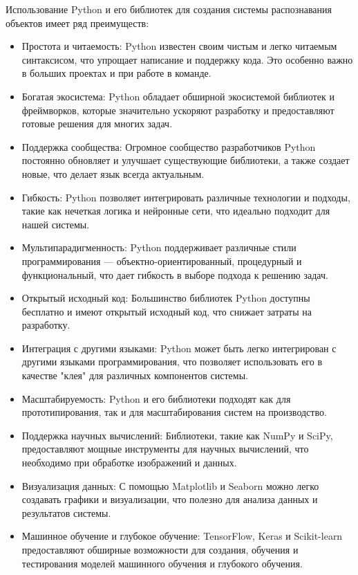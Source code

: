 Использование Python и его библиотек для создания системы распознавания объектов имеет ряд преимуществ:

\begin{itemize}
\item Простота и читаемость: Python известен своим чистым и легко читаемым синтаксисом, что упрощает написание и поддержку кода. Это особенно важно в больших проектах и при работе в команде.
\item Богатая экосистема: Python обладает обширной экосистемой библиотек и фреймворков, которые значительно ускоряют разработку и предоставляют готовые решения для многих задач.
\item Поддержка сообщества: Огромное сообщество разработчиков Python постоянно обновляет и улучшает существующие библиотеки, а также создает новые, что делает язык всегда актуальным.
\item Гибкость: Python позволяет интегрировать различные технологии и подходы, такие как нечеткая логика и нейронные сети, что идеально подходит для нашей системы.
\item Мультипарадигменность: Python поддерживает различные стили программирования — объектно-ориентированный, процедурный и функциональный, что дает гибкость в выборе подхода к решению задач.
\item Открытый исходный код: Большинство библиотек Python доступны бесплатно и имеют открытый исходный код, что снижает затраты на разработку.
\item Интеграция с другими языками: Python может быть легко интегрирован с другими языками программирования, что позволяет использовать его в качестве "клея" для различных компонентов системы.
\item Масштабируемость: Python и его библиотеки подходят как для прототипирования, так и для масштабирования систем на производство.
\item Поддержка научных вычислений: Библиотеки, такие как NumPy и SciPy, предоставляют мощные инструменты для научных вычислений, что необходимо при обработке изображений и данных.
\item Визуализация данных: С помощью Matplotlib и Seaborn можно легко создавать графики и визуализации, что полезно для анализа данных и результатов системы.
\item Машинное обучение и глубокое обучение: TensorFlow, Keras и Scikit-learn предоставляют обширные возможности для создания, обучения и тестирования моделей машинного обучения и глубокого обучения.
\end{itemize}

